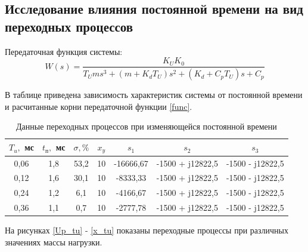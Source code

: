 \documentclass[a4paper, 12pt]{article}
\renewcommand{\arraystretch}{1.3}
\renewcommand{\tabcolsep}{0.7cm}
\begin{document}
\newpage

\begin{center}
	\section{Исследование влияния постоянной времени на вид переходных процессов}
\end{center}\par

Передаточная функция системы:\\
\begin{equation}
	W(s)=\frac{K_UK_0}{T_Ums^3+(m+K_dT_U)s^2+(K_d+C_pT_U)s+C_p}
	\label{func}
\end{equation}\par

В таблице  приведена зависимость характеристик системы от постоянной времени и расчитанные корни передаточной функции \ref{func}.  

\begin{table}[ht!]
	\centering
	\begin{threeparttable}
		\caption{Данные переходных процессов при изменяющейся постоянной времени}
		\renewcommand{\arraystretch}{1.3}
		\renewcommand{\tabcolsep}{0.45cm}
		\begin{tabular}{|c|c|c|c|c|c|c|}
			\hline
			$T_u,$ мс	& $t_\text{п},$ мс	& $\sigma, \%$	& $x_y$	& $s_1$		& $s_2$								& $s_3$								\\
			\hline
			0,06		& 1,8				& 53,2			& 10	& -16666,67	&-1500 + j12822,5	& -1500 - j12822,5\\
			\hline
			0,12		& 1,6				& 30,1			& 10	& -8333,33	&-1500 + j12822,5	& -1500 - j12822,5\\
			\hline
			0,24		& 1,2				& 6,1			& 10	& -4166,67	&-1500 + j12822,5	& -1500 - j12822,5\\
			\hline
			0,36		& 1,1				& 0,7			& 10	& -2777,78	&-1500 + j12822,5	& -1500 - j12822,5\\
			\hline
		\end{tabular}
		\label{tvarTab}
	\end{threeparttable}
\end{table}\par

На рисунках \ref{Up_tu} - \ref{x_tu} показаны переходные процессы при различных значениях массы нагрузки.
\end{document}
